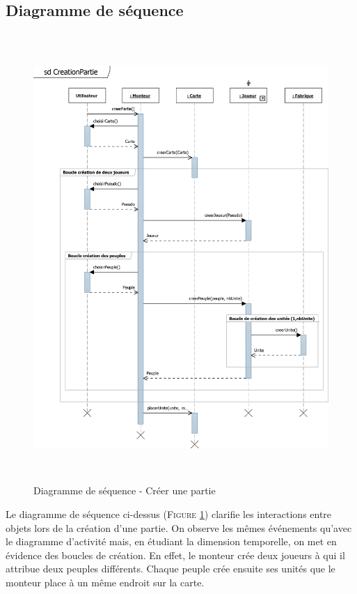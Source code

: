 \documentclass[a4paper,11pt]{article}
\begin{document}
	\subsection{Diagramme de séquence}
		\begin{figure}[ht!]
			\includegraphics[height=17cm]{Diagrammes/Creation/sqCreerPartie.png}
			\caption{Diagramme de séquence - Créer une partie}
			\label{fig:seqcreer}
			\end{figure}
		\vspace*{1cm}
		Le diagramme de séquence ci-dessus (\textsc{Figure \ref{fig:seqcreer}}) clarifie les interactions entre objets lors de la création d'une partie. On observe les mêmes événements qu'avec le diagramme d'activité mais, en étudiant la dimension temporelle, on met en évidence des boucles de création. En effet, le monteur crée deux joueurs à qui il attribue deux peuples différents. Chaque peuple crée ensuite ses unités que le monteur place à un même endroit sur la carte.
		\newpage 
\end{document}
